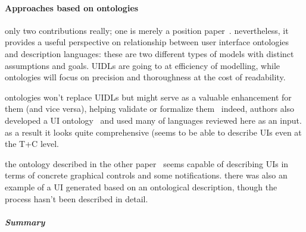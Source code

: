 \paragraph{Approaches based on ontologies}

only two contributions really;
one is merely a position paper~\cite{paulheim_formal_2011}.
nevertheless, it provides a useful perspective on relationship between user interface ontologies and description languages:
these are two different types of models with distinct assumptions and goals.
UIDLs are going to at efficiency of modelling, while ontologies will focus on precision and thoroughness at the cost of readability.

ontologies won't replace UIDLs but might serve as a valuable enhancement for them (and vice versa), helping validate or formalize them \textemdash\ indeed, authors also developed a UI ontology~\cite{paulheim_ui2ont_2013} and used many of languages reviewed here as an input.
as a result it looks quite comprehensive (seems to be able to describe UIs even at the T+C level.

the ontology described in the other paper~\cite{wysota_semantic_2015} seems capable of describing UIs in terms of concrete graphical controls and some notifications.
there was also an example of a UI generated based on an ontological description, though the process hasn't been described in detail.

\subparagraph{Summary}


